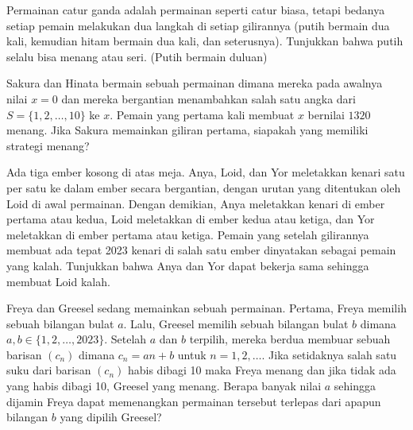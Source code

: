 \documentclass[12pt]{scrartcl}
\begin{document}
\begin{soaljawab}
Permainan catur ganda adalah permainan seperti catur biasa, tetapi bedanya setiap pemain melakukan dua langkah di setiap gilirannya (putih bermain dua kali, kemudian hitam bermain dua kali, dan seterusnya). Tunjukkan bahwa putih selalu bisa menang atau seri. (Putih bermain duluan)
\end{soaljawab}

\begin{soaljawab}
Sakura dan Hinata bermain sebuah permainan dimana mereka pada awalnya nilai $x=0$ dan mereka bergantian menambahkan salah satu angka dari $S=\{1,2,\dots,10\}$ ke $x$. Pemain yang pertama kali membuat $x$ bernilai $1320$ menang. Jika Sakura memainkan giliran pertama, siapakah yang memiliki strategi menang?
\end{soaljawab}

\begin{soaljawab}
Ada tiga ember kosong di atas meja. Anya, Loid, dan Yor meletakkan kenari satu per satu ke dalam ember secara bergantian, dengan urutan yang ditentukan oleh Loid di awal permainan. Dengan demikian, Anya meletakkan kenari di ember pertama atau kedua, Loid meletakkan di ember kedua atau ketiga, dan Yor meletakkan di ember pertama atau ketiga. Pemain yang setelah gilirannya membuat ada tepat 2023 kenari di salah satu ember dinyatakan sebagai pemain yang kalah. Tunjukkan bahwa Anya dan Yor dapat bekerja sama sehingga membuat Loid kalah.
\end{soaljawab}

\begin{soaljawab}
    Freya dan Greesel sedang memainkan sebuah permainan. Pertama, Freya memilih sebuah bilangan bulat $a$. Lalu, Greesel memilih sebuah bilangan bulat $b$ dimana $a,b \in \{1,2,\dots,2023\}$. Setelah $a$ dan $b$ terpilih, mereka berdua membuar sebuah barisan $(c_n)$ dimana $c_n = an + b$ untuk $n = 1,2,\dots$. Jika setidaknya salah satu suku dari barisan $(c_n)$ habis dibagi 10 maka Freya menang dan jika tidak ada yang habis dibagi 10, Greesel yang menang. Berapa banyak nilai $a$ sehingga dijamin Freya dapat memenangkan permainan tersebut terlepas dari apapun bilangan $b$ yang dipilih Greesel?
\end{soaljawab}
\end{document}
